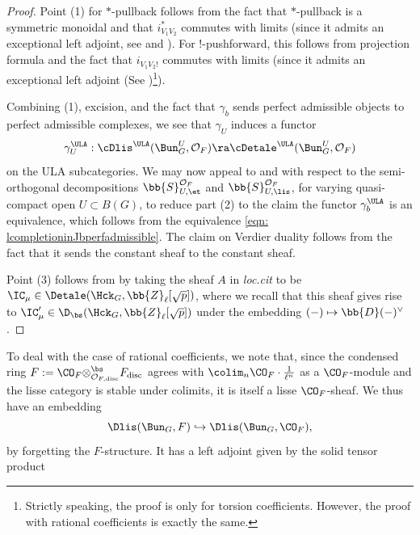 \documentclass[letterpaper,11pt]{amsart}
\begin{document}
\begin{proof}
Point (1) for $*$-pullback follows from the fact that $*$-pullback is a symmetric monoidal and that $i_{V_{1}V_{2}}^{*}$ commutes with limits (since it admits an exceptional left adjoint, see \cite[Proposition~VII.7.2]{FSGeomLLC} and \cite[Proposition~9.5]{GHILZIsocComparison}). For $!$-pushforward, this follows from projection formula and the fact that $i_{V_{1}V_{2}!}$ commutes with limits (since it admits an exceptional left adjoint (See \cite[Proposition~9.5]{GHILZIsocComparison})\footnote{Strictly speaking, the proof is only for torsion coefficients. However, the proof with rational coefficients is exactly the same.}). 

Combining (1), excision, and the fact that $\gamma_{b}$ sends perfect admissible objects to perfect admissible complexes, we see that $\gamma_{U}$ induces a functor 
\[ \gamma_{U}^{\ULA}: \cDlis^{\ULA}(\Bun_{G}^{U},\mathcal{O}_{F}) \ra \cDetale^{\ULA}(\Bun_{G}^{U},\mathcal{O}_{F}) \]
on the ULA subcategories. We may now appeal to \cite[Proposition~6.4.4]{GHILZIsocComparison} and \cite[Proposition~6.4.5]{GHILZIsocComparison} with respect to the semi-orthogonal decompositions $\bb{S}^{\mathcal{O}_{F}}_{U,\et}$ and $\bb{S}^{\mathcal{O}_{F}}_{U,\lis}$, for varying quasi-compact open $U \subset B(G)$, to reduce part (2) to the claim the functor $\gamma_{b}^{\ULA}$ is an equivalence, which follows from the equivalence \eqref{eqn: lcompletioninJbperfadmissible}. The claim on Verdier duality follows from the fact that it sends the constant sheaf to the constant sheaf.

Point (3) follows from \cite[Proposition VII.5.2]{FSGeomLLC} by taking the sheaf $A$ in \emph{loc.cit} to be $\IC_{\mu} \in \Detale(\Hck_{G},\bb{Z}_{\ell}[\sqrt{p}])$, where we recall that this sheaf gives rise to $\IC'_{\mu} \in \D_{\bs}(\Hck_{G},\bb{Z}_{\ell}[\sqrt{p}])$ under the embedding $(-)\mapsto \bb{D}(-)^\vee$.
\end{proof}
To deal with the case of rational coefficients, we note that, since the condensed ring $F:=\CO_F{\otimes^{\bs}_{\mathcal{O}_{F,\mathrm{disc}}} F_{\mathrm{disc}}}$ agrees with $\colim_{n}\CO_F\cdot \tfrac{1}{\ell^n}$ as a $\CO_F$-module and the lisse category is stable under colimits, it is itself a lisse $\CO_F$-sheaf. We thus have an embedding
\begin{equation}\label{eq: FasOFmodule}
    \Dlis(\Bun_{G},{F}) \hookrightarrow \Dlis(\Bun_{G},\CO_F),
\end{equation}
by forgetting the $F$-structure. It has a left adjoint given by the solid tensor product
\end{document}
